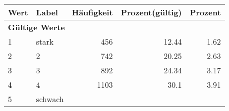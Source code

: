      \begin{longtable}{lXrrr}
     \toprule
     \textbf{Wert} & \textbf{Label} & \textbf{Häufigkeit} & \textbf{Prozent(gültig)} & \textbf{Prozent} \\
     \endhead
     \midrule
     \multicolumn{5}{l}{\textbf{Gültige Werte}}\\

     1 &
     \multicolumn{1}{X}{ stark   } &


       \num{456} &
       \num[round-mode=places,round-precision=2]{12,44} &
         \num[round-mode=places,round-precision=2]{1,62} \\

     2 &
     \multicolumn{1}{X}{ 2   } &


       \num{742} &
       \num[round-mode=places,round-precision=2]{20,25} &
         \num[round-mode=places,round-precision=2]{2,63} \\

     3 &
     \multicolumn{1}{X}{ 3   } &


       \num{892} &
       \num[round-mode=places,round-precision=2]{24,34} &
         \num[round-mode=places,round-precision=2]{3,17} \\

     4 &
     \multicolumn{1}{X}{ 4   } &


       \num{1103} &
       \num[round-mode=places,round-precision=2]{30,1} &
         \num[round-mode=places,round-precision=2]{3,91} \\

     5 &
     \multicolumn{1}{X}{ schwach   } &



\end{longtable}

